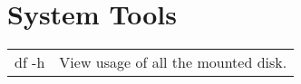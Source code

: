 \section{System Tools}

\begin{tabularx}{\linewidth}{lX}
    df -h & View usage of all the mounted disk.\\



\end{tabularx}

\vfill\null
\columnbreak